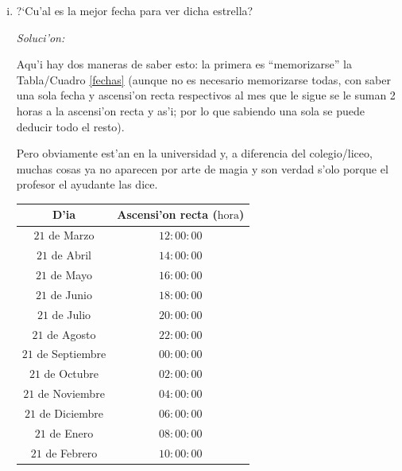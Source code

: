 \documentclass{article}
\newenvironment{myfont}{\fontfamily{pnc}\selectfont}{\par}
\begin{document}
\begin{enumerate}[a)]
\begin{enumerate} [i)]
\begin{equation*}
H = 90^\circ + \Phi - \delta
\end{equation*} 

Que reemplazando con los datos dados es:

\begin{equation*}
H = 90^\circ + (-12^\circ) - (+20^\circ) = 90^\circ - 12^\circ - 20^\circ = 58^\circ
\end{equation*}

De manera que la m'axima altura que alcanzar'a esta estrella, vista desde Lima, Per'u, ser'a de $58^\circ$ sobre el horizonte mirando hacia el Norte.

\newpage

\begin{myfont}
\item ?`Cu'al es la mejor fecha para ver dicha estrella?
\end{myfont}

\emph{Soluci'on:}

Aqu'i hay dos maneras de saber esto: la primera es ``memorizarse'' la Tabla/Cuadro \ref{fechas} (aunque no es necesario memorizarse todas, con saber una sola fecha y ascensi'on recta respectivos al mes que le sigue se le suman 2 horas a la ascensi'on recta y as'i; por lo que sabiendo una sola se puede deducir todo el resto).

Pero obviamente est'an en la universidad y, a diferencia del colegio/liceo, muchas cosas ya no aparecen por arte de magia y son verdad s'olo porque el profesor el ayudante las dice.

\vspace{3mm}

\begin{center}
\begin{tabularx}{\linewidth}{*{2}{C}} \toprule
D'ia & Ascensi'on recta ($\text{hora}$) \\\midrule
$21$ de Marzo   & $12:00:00$    \\ 
 $21$ de Abril & $14:00:00$  \\ 
 $21$ de Mayo & $16:00:00$  \\
 $21$ de Junio & $18:00:00$ \\
 $21$ de Julio & $20:00:00$ \\
 $21$ de Agosto & $22:00:00$ \\
 $21$ de Septiembre & $00:00:00$ \\
 $21$ de Octubre & $02:00:00$   \\
 $21$ de Noviembre & $04:00:00$  \\
 $21$ de Diciembre & $06:00:00$ \\
 $21$ de Enero& $08:00:00$\\
 $21$ de Febrero & $10:00:00$ \\\bottomrule
\hline
\end{tabularx}
 \label{fechas}
\end{center}


\end{enumerate}
\end{enumerate}
\end{document}
